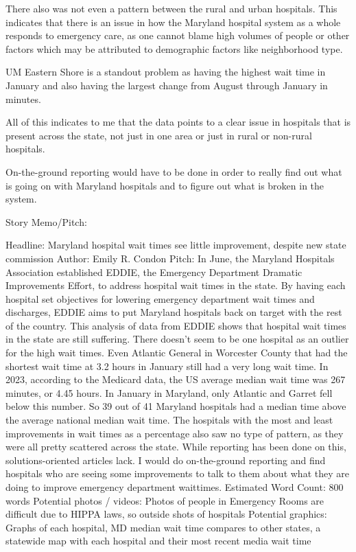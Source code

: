 \documentclass[
  letterpaper,
  DIV=11,
  numbers=noendperiod]{scrartcl}
\begin{document}
There also was not even a pattern between the rural and urban hospitals.
This indicates that there is an issue in how the Maryland hospital
system as a whole responds to emergency care, as one cannot blame high
volumes of people or other factors which may be attributed to
demographic factors like neighborhood type.

UM Eastern Shore is a standout problem as having the highest wait time
in January and also having the largest change from August through
January in minutes.

All of this indicates to me that the data points to a clear issue in
hospitals that is present across the state, not just in one area or just
in rural or non-rural hospitals.

On-the-ground reporting would have to be done in order to really find
out what is going on with Maryland hospitals and to figure out what is
broken in the system.

Story Memo/Pitch:

Headline: Maryland hospital wait times see little improvement, despite
new state commission Author: Emily R. Condon Pitch: In June, the
Maryland Hospitals Association established EDDIE, the Emergency
Department Dramatic Improvements Effort, to address hospital wait times
in the state. By having each hospital set objectives for lowering
emergency department wait times and discharges, EDDIE aims to put
Maryland hospitals back on target with the rest of the country. This
analysis of data from EDDIE shows that hospital wait times in the state
are still suffering. There doesn't seem to be one hospital as an outlier
for the high wait times. Even Atlantic General in Worcester County that
had the shortest wait time at 3.2 hours in January still had a very long
wait time. In 2023, according to the Medicard data, the US average
median wait time was 267 minutes, or 4.45 hours. In January in Maryland,
only Atlantic and Garret fell below this number. So 39 out of 41
Maryland hospitals had a median time above the average national median
wait time. The hospitals with the most and least improvements in wait
times as a percentage also saw no type of pattern, as they were all
pretty scattered across the state. While reporting has been done on
this, solutions-oriented articles lack. I would do on-the-ground
reporting and find hospitals who are seeing some improvements to talk to
them about what they are doing to improve emergency department
waittimes. Estimated Word Count: 800 words Potential photos / videos:
Photos of people in Emergency Rooms are difficult due to HIPPA laws, so
outside shots of hospitals Potential graphics: Graphs of each hospital,
MD median wait time compares to other states, a statewide map with each
hospital and their most recent media wait time
\end{document}
